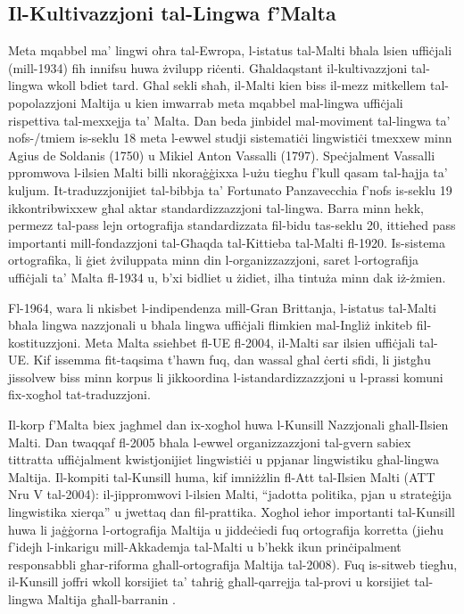 \begin{multicols}{2}
\subsection{Il-Kultivazzjoni tal-Lingwa f'Malta}

Meta mqabbel ma’ lingwi oħra tal-Ewropa, l-istatus tal-Malti bħala lsien uffiċjali (mill-1934) fih innifsu huwa żvilupp riċenti. Għaldaqstant il-kultivazzjoni tal-lingwa wkoll bdiet tard.
Għal sekli sħaħ, il-Malti kien biss il-mezz mitkellem tal-popolazzjoni Maltija u kien imwarrab meta mqabbel mal-lingwa uffiċjali rispettiva tal-mexxejja ta’ Malta. Dan beda jinbidel mal-moviment tal-lingwa ta’ nofs-/tmiem is-seklu 18 meta l-ewwel studji sistematiċi lingwistiċi tmexxew minn Agius de Soldanis (1750) u Mikiel Anton Vassalli (1797). Speċjalment Vassalli ppromwova l-ilsien Malti billi nkoraġġixxa l-użu tiegħu f'kull qasam tal-ħajja ta’ kuljum. It-traduzzjonijiet tal-bibbja ta’ Fortunato Panzavecchia f’nofs is-seklu 19 ikkontribwixxew għal aktar standardizzazzjoni tal-lingwa. Barra minn hekk, permezz tal-pass lejn ortografija standardizzata fil-bidu tas-seklu 20, ittieħed pass  importanti mill-fondazzjoni tal-Għaqda tal-Kittieba tal-Malti fl-1920. Is-sistema ortografika, li ġiet żviluppata minn din l-organizzazzjoni, saret l-ortografija uffiċjali ta’ Malta fl-1934 u, b'xi bidliet u żidiet, ilha tintuża minn dak iż-żmien.

Fl-1964, wara li nkisbet l-indipendenza mill-Gran Brittanja, l-istatus tal-Malti bħala lingwa nazzjonali u bħala lingwa uffiċjali flimkien mal-Ingliż inkiteb fil-kostituzzjoni. Meta Malta ssieħbet fl-UE fl-2004, il-Malti sar ilsien uffiċjali tal-UE. Kif issemma fit-taqsima t’hawn fuq, dan wassal għal ċerti sfidi, li jistgħu jissolvew biss minn korpus li jikkoordina l-istandardizzazzjoni u l-prassi komuni fix-xogħol tat-traduzzjoni.

Il-korp f'Malta biex jagħmel dan ix-xogħol huwa l-Kunsill Nazzjonali għall-Ilsien Malti. Dan twaqqaf fl-2005 bħala l-ewwel organizzazzjoni tal-gvern sabiex tittratta uffiċjalment kwistjonijiet lingwistiċi u ppjanar lingwistiku għal-lingwa Maltija. Il-kompiti tal-Kunsill huma, kif imniżżlin fl-Att tal-Ilsien Malti (ATT Nru V tal-2004): il-jippromwovi l-ilsien Malti, ``jadotta politika, pjan u strateġija lingwistika xierqa'' u jwettaq dan fil-prattika. Xogħol ieħor importanti tal-Kunsill huwa li jaġġorna l-ortografija Maltija u jiddeċiedi fuq ortografija korretta (jieħu f’idejh l-inkarigu mill-Akkademja tal-Malti u b’hekk ikun prinċipalment responsabbli għar-riforma għall-ortografija Maltija tal-2008). Fuq is-sitweb tiegħu, il-Kunsill joffri wkoll korsijiet ta’ taħriġ għall-qarrejja tal-provi u korsijiet tal-lingwa Maltija għall-barranin \cite{Kunsill1}.
\columnbreak


\end{multicols}
